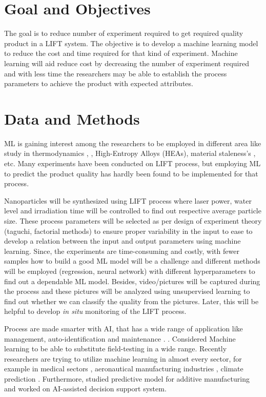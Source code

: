 \documentclass[letterpaper]{article}
\begin{document}
\section*{Goal and Objectives}
The goal is to reduce number of experiment required to get required quality product in a LIFT system. The objective is to develop a machine learning model to reduce the cost and time required for that kind of experiment. Machine learning will aid reduce cost by decreasing the number of experiment required and with less time the researchers may be able to establish the process parameters to achieve the product with expected attributes.

\section*{Data and Methods}
ML is gaining interest among the researchers to be employed in different area like study in thermodynamics \parencite[]{ding}, \parencite[]{thermal},  High-Entropy Alloys (HEAs)\parencite[]{qiao}, material staleness's \parencite[]{he}, etc. Many experiments have been conducted on LIFT process, but employing ML to predict the product quality has hardly been found to be implemented for that process.
\par
Nanoparticles will be synthesized using LIFT process where laser power, water level and irradiation time will be controlled to find out respective average particle size. These process parameters will be selected as per design of experiment theory (taguchi, factorial methods) to ensure proper variability in the input to ease to develop a relation between the input and output parameters using machine learning. Since, the experiments are time-consuming and costly, with fewer samples how to build a good ML model will be a challenge and different methods will be employed (regression, neural network) with different hyperparameters to find out a dependable ML model. Besides, video/pictures will be captured during the process and these pictures will be analyzed using unsupervised learning to find out whether we can classify the quality from the pictures. Later, this will be helpful to develop \textit{in situ} monitoring of the LIFT process.\par
Process are made smarter with AI, that has a wide range of application like management, auto-identification and maintenance \parencite[]{xu}. \parencite[]{bourhis}. Considered Machine learning to be able to substitute field-testing in a wide range. Recently researchers are trying to utilize machine learning in almost every sector, for example in medical sectors \parencite[]{twin}, aeronautical manufacturing industries \parencite[]{zohdi}, climate prediction \parencite[]{koc}.  Furthermore, \parencite[]{tapia}  studied predictive model for additive manufacturing and \parencite[]{kharchenko} worked on AI-assisted decision support system.
\end{document}
